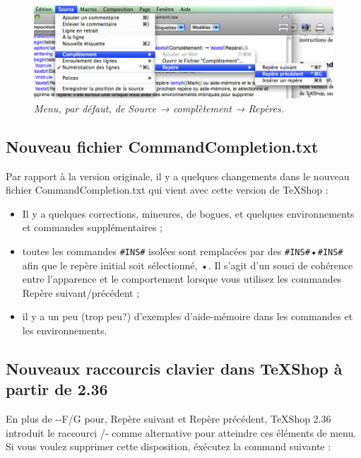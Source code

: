 \documentclass[12pt,french]{article}
\newcommand{\esc}{{\WD \symbol{82}}}
\newcommand{\alt}{{\WD \symbol{85}}}
\newcommand{\ctr}{{\WD \symbol{84}}}
\newcommand{\cmd}{{\WA \symbol{122}}}
\newcommand{\texs}{\textsf{\TeX{}Shop}}
\newcommand{\pointbleu}{\colorbox{cyan!40}{\kern-3pt•\kern-3pt}}
\begin{document}
\begin{figure}[htbp]
\centering
\includegraphics[width=\textwidth]{mark1}
\caption{\emph{Menu, par défaut, de \textsf{Source} → \textsf{complètement} → \textsf{Repères}.}\label{menu}}
\end{figure}

\subsection*{Nouveau fichier \textsf{CommandCompletion.txt}}

Par rapport à la version originale, il y a quelques changements dans le nouveau fichier 
\textsf{CommandCompletion.txt} qui vient avec cette version de \texs{} :

\begin{itemize}
\item Il y a quelques corrections, mineures, de bogues, et quelques environnements et commandes supplémentaires ;
\item toutes les commandes \texttt{\#INS\#} isolées sont remplacées par des \texttt{\#INS\#}•\texttt{\#INS\#} afin que 
le repère initial soit sélectionné, \pointbleu. Il s'agit d'un souci de cohérence entre l'apparence et le comportement 
lorsque vous utilisez les commandes \textsf{Repère suivant/précédent} ;
\item il y a un peu (trop peu?) d'exemples d'aide-mémoire dans les commandes et les environnements.
\end{itemize}

\subsection*{Nouveaux raccourcis clavier dans \texs{} à partir de 2.36}

En plus de \ctr{}-\cmd{}-F/G pour, \textsf{Repère suivant} et \textsf{Repère précédent}, \texs{} 2.36 introduit le 
raccourci \alt{}/\ctr{}-\esc{} comme alternative pour atteindre ces éléments de menu. Si vous voulez supprimer cette 
disposition, éxécutez la command suivante :
\end{document}
